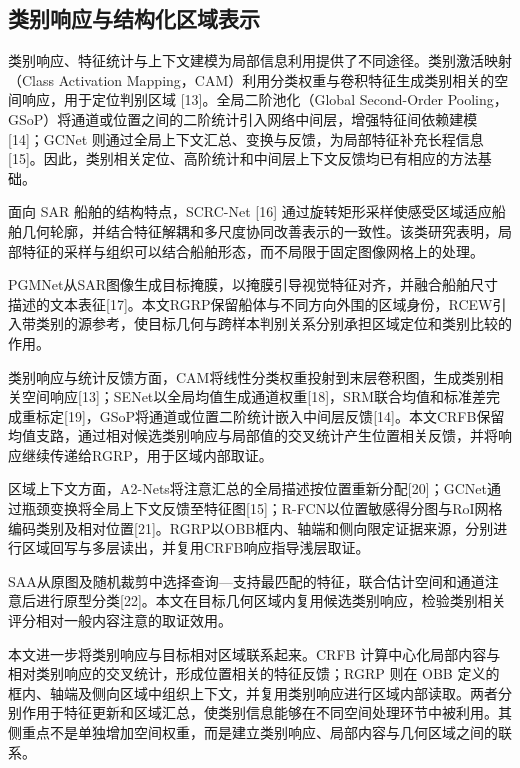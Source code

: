 \documentclass[journal,10pt,a4paper]{IEEEtran}
\begin{document}
\subsection{类别响应与结构化区域表示}\label{ux7c7bux522bux54cdux5e94ux4e0eux7ed3ux6784ux5316ux533aux57dfux8868ux793a}

类别响应、特征统计与上下文建模为局部信息利用提供了不同途径。类别激活映射（Class Activation Mapping，CAM）利用分类权重与卷积特征生成类别相关的空间响应，用于定位判别区域 {[}13{]}。全局二阶池化（Global Second-Order Pooling，GSoP）将通道或位置之间的二阶统计引入网络中间层，增强特征间依赖建模 {[}14{]}；GCNet 则通过全局上下文汇总、变换与反馈，为局部特征补充长程信息 {[}15{]}。因此，类别相关定位、高阶统计和中间层上下文反馈均已有相应的方法基础。

面向 SAR 船舶的结构特点，SCRC-Net {[}16{]} 通过旋转矩形采样使感受区域适应船舶几何轮廓，并结合特征解耦和多尺度协同改善表示的一致性。该类研究表明，局部特征的采样与组织可以结合船舶形态，而不局限于固定图像网格上的处理。

PGMNet从SAR图像生成目标掩膜，以掩膜引导视觉特征对齐，并融合船舶尺寸描述的文本表征{[}17{]}。本文RGRP保留船体与不同方向外围的区域身份，RCEW引入带类别的源参考，使目标几何与跨样本判别关系分别承担区域定位和类别比较的作用。

类别响应与统计反馈方面，CAM将线性分类权重投射到末层卷积图，生成类别相关空间响应{[}13{]}；SENet以全局均值生成通道权重{[}18{]}，SRM联合均值和标准差完成重标定{[}19{]}，GSoP将通道或位置二阶统计嵌入中间层反馈{[}14{]}。本文CRFB保留均值支路，通过相对候选类别响应与局部值的交叉统计产生位置相关反馈，并将响应继续传递给RGRP，用于区域内部取证。

区域上下文方面，A2-Nets将注意汇总的全局描述按位置重新分配{[}20{]}；GCNet通过瓶颈变换将全局上下文反馈至特征图{[}15{]}；R-FCN以位置敏感得分图与RoI网格编码类别及相对位置{[}21{]}。RGRP以OBB框内、轴端和侧向限定证据来源，分别进行区域回写与多层读出，并复用CRFB响应指导浅层取证。

SAA从原图及随机裁剪中选择查询---支持最匹配的特征，联合估计空间和通道注意后进行原型分类{[}22{]}。本文在目标几何区域内复用候选类别响应，检验类别相关评分相对一般内容注意的取证效用。

本文进一步将类别响应与目标相对区域联系起来。CRFB 计算中心化局部内容与相对类别响应的交叉统计，形成位置相关的特征反馈；RGRP 则在 OBB 定义的框内、轴端及侧向区域中组织上下文，并复用类别响应进行区域内部读取。两者分别作用于特征更新和区域汇总，使类别信息能够在不同空间处理环节中被利用。其侧重点不是单独增加空间权重，而是建立类别响应、局部内容与几何区域之间的联系。
\end{document}
